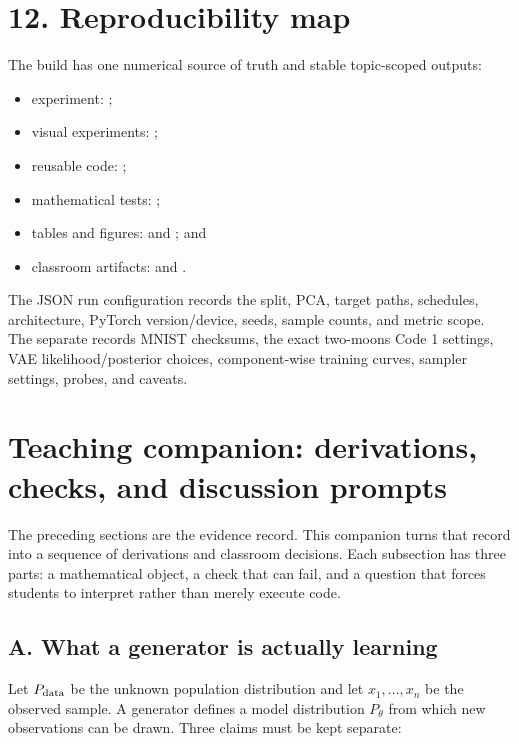 \documentclass[11pt]{article}
\begin{document}
\section*{12. Reproducibility map}

The build has one numerical source of truth and stable topic-scoped outputs:
\begin{itemize}
\item experiment: ;
\item visual experiments: ;
\item reusable code: ;
\item mathematical tests: ;
\item tables and figures:  and
; and
\item classroom artifacts:  and
.
\end{itemize}
The JSON run configuration records the split, PCA, target paths, schedules,
architecture, PyTorch version/device, seeds, sample counts, and metric scope.
The separate  records MNIST checksums, the exact
two-moons Code 1 settings, VAE likelihood/posterior choices, component-wise
training curves, sampler settings, probes, and caveats.


\clearpage
\section*{Teaching companion: derivations, checks, and discussion prompts}

The preceding sections are the evidence record. This companion turns that
record into a sequence of derivations and classroom decisions. Each subsection
has three parts: a mathematical object, a check that can fail, and a question
that forces students to interpret rather than merely execute code.

\subsection*{A. What a generator is actually learning}

Let $P_{\rm data}$ be the unknown population distribution and let
$x_1,\ldots,x_n$ be the observed sample. A generator defines a model
distribution $P_\theta$ from which new observations can be drawn. Three claims
must be kept separate:
\end{document}
